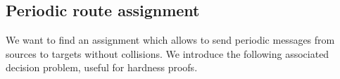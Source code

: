 \documentclass[10pt]{article}
\begin{document}
	 
%
%  
%          
%
%
%
%
%  
%
%  
%
%

      \subsection{Periodic route assignment}\label{nonmonotone}

    We want to find an assignment which allows to send periodic messages from sources to targets
    without collisions. We introduce the following associated decision problem, useful for hardness proofs.
    
\end{document}
